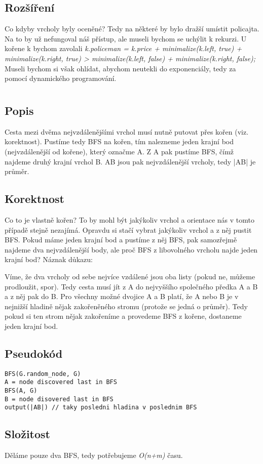 \documentclass[a4paper]{article}
\begin{document}
\subsection{Rozšíření}
Co kdyby vrcholy byly oceněné? Tedy na některé by bylo dražší umístit policajta. Na to by už nefungoval náš přístup, ale museli bychom se uchýlit k rekurzi. U kořene k bychom zavolali \textit{k.policeman = k.price + minimalize(k.left, true) + minimalize(k.right, true) > minimalize(k.left, false) + minimalize(k.right, false);} Museli bychom si však ohlídat, abychom neutekli do exponenciály, tedy za pomocí dynamického programování.

\section{}
\subsection{Popis}
Cesta mezi dvěma nejvzdálenějšími vrchol musí nutně putovat přes kořen (viz. korektnost). Pustíme tedy BFS na kořen, tím nalezneme jeden krajní bod (nejvzdálenější od kořene), který označme A. Z A pak pustíme BFS, čímž najdeme druhý krajní vrchol B. AB jsou pak nejvzdálenější vrcholy, tedy |AB| je průměr.

\subsection{Korektnost}
Co to je vlastně kořen? To by mohl být jakýkoliv vrchol a orientace nás v tomto případě stejně nezajímá. Opravdu si stačí vybrat jakýkoliv vrchol a z něj pustit BFS. Pokud máme jeden krajní bod a pustíme z něj BFS, pak samozřejmě najdeme dva nejvzdálenější body, ale proč BFS z libovolného vrcholu najde jeden krajní bod? Náznak důkazu:

Víme, že dva vrcholy od sebe nejvíce vzdálené jsou oba listy (pokud ne, můžeme prodloužit, spor). Tedy cesta musí jít z A do nejvyššího společného předka A a B a z něj pak do B. Pro všechny možné dvojice A a B platí, že A nebo B je v nejnižší hladině nějak zakořeněného stromu (protože se jedná o průměr). Tedy pokud si ten strom nějak zakořeníme a provedeme BFS z kořene, dostaneme jeden krajní bod.

\subsection{Pseudokód} 
\begin{lstlisting}
BFS(G.random_node, G)
A = node discovered last in BFS
BFS(A, G)
B = node disovered last in BFS
output(|AB|) // taky posledni hladina v poslednim BFS
\end{lstlisting}

\subsection{Složitost}
Děláme pouze dva BFS, tedy potřebujeme \textit{O(n+m)} času.
\end{document}
